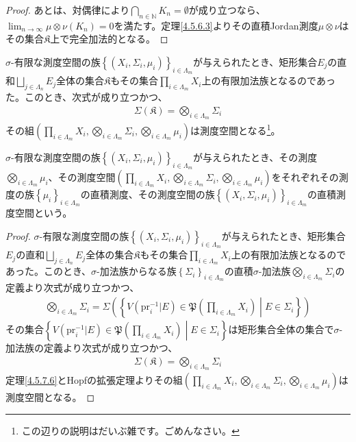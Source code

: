 \documentclass[dvipdfmx]{jsarticle}
\begin{document}
\begin{proof}
あとは、対偶律により$\bigcap_{n \in \mathbb{N}} K_{n} = \emptyset$が成り立つなら、$\lim_{n \rightarrow \infty}{\mu \otimes \nu\left( K_{n} \right)} = 0$を満たす。定理\ref{4.5.6.3}よりその直積Jordan測度$\mu \otimes \nu$はその集合$\mathfrak{K}$上で完全加法的となる。
\end{proof}
\begin{thm}\label{4.5.7.7}
$\sigma$-有限な測度空間の族$\left\{ \left( X_{i},\varSigma_{i},\mu_{i} \right) \right\}_{i \in \varLambda_{m} }$が与えられたとき、矩形集合$E_{j}$の直和$\bigsqcup_{j \in \varLambda_{n} } E_{j}$全体の集合$\mathfrak{K}$もその集合$\prod_{i \in \varLambda_{m} } X_{i}$上の有限加法族となるのであった。このとき、次式が成り立つかつ、
\begin{align*}
\varSigma\left( \mathfrak{K} \right) = \bigotimes_{i \in \varLambda_{m} } \varSigma_{i}
\end{align*}
その組$\left( \prod_{i \in \varLambda_{m}} X_{i},\bigotimes_{i \in \varLambda_{m}} \varSigma_{i},\bigotimes_{i \in \varLambda_{m}} \mu_{i} \right)$は測度空間となる\footnote{この辺りの説明はだいぶ雑です。ごめんなさい。}。
\end{thm}
\begin{dfn}
$\sigma$-有限な測度空間の族$\left\{ \left( X_{i},\varSigma_{i},\mu_{i} \right) \right\}_{i \in \varLambda_{m} }$が与えられたとき、その測度$\bigotimes_{i \in \varLambda_{m}} \mu_{i}$、その測度空間$\left( \prod_{i \in \varLambda_{m}} X_{i},\bigotimes_{i \in \varLambda_{m}} \varSigma_{i},\bigotimes_{i \in \varLambda_{m}} \mu_{i} \right)$をそれぞれその測度の族$\left\{ \mu_{i} \right\}_{i \in \varLambda_{m}}$の直積測度、その測度空間の族$\left\{ \left( X_{i},\varSigma_{i},\mu_{i} \right) \right\}_{i \in \varLambda_{m}}$の直積測度空間という。
\end{dfn}
\begin{proof}
$\sigma$-有限な測度空間の族$\left\{ \left( X_{i},\varSigma_{i},\mu_{i} \right) \right\}_{i \in \varLambda_{m} }$が与えられたとき、矩形集合$E_{j}$の直和$\bigsqcup_{j \in \varLambda_{n} } E_{j}$全体の集合$\mathfrak{K}$もその集合$\prod_{i \in \varLambda_{m} } X_{i}$上の有限加法族となるのであった。このとき、$\sigma$-加法族からなる族$\left\{ \varSigma_{i} \right\}_{i \in \varLambda_{m}}$の直積$\sigma$-加法族$\bigotimes_{i \in \varLambda_{m}} \varSigma_{i}$の定義より次式が成り立つかつ、
\begin{align*}
\bigotimes_{i \in \varLambda_{m}} \varSigma_{i} = \varSigma\left( \left\{ V\left( \mathrm{pr}_{i}^{- 1}|E \right)\in \mathfrak{P}\left( \prod_{i \in \varLambda_{m}} X_{i} \right) \middle| E \in \varSigma_{i} \right\} \right)
\end{align*}
その集合$\left\{ V\left( \mathrm{pr}_{i}^{- 1}|E \right)\in \mathfrak{P}\left( \prod_{i \in \varLambda_{m}} X_{i} \right) \middle| E \in \varSigma_{i} \right\}$は矩形集合全体の集合で$\sigma$-加法族の定義より次式が成り立つかつ、
\begin{align*}
\varSigma\left( \mathfrak{K} \right) = \bigotimes_{i \in \varLambda_{m}} \varSigma_{i}
\end{align*}
定理\ref{4.5.7.6}とHopfの拡張定理よりその組$\left( \prod_{i \in \varLambda_{m}} X_{i},\bigotimes_{i \in \varLambda_{m}} \varSigma_{i},\bigotimes_{i \in \varLambda_{m}} \mu_{i} \right)$は測度空間となる。
\end{proof}
\end{document}
